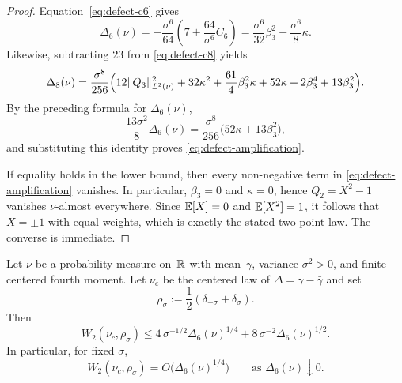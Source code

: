 \begin{proof}
Equation~\eqref{eq:defect-c6} gives
\[
\Delta_6(\nu)
=-\frac{\sigma^6}{64}\left(7+\frac{64}{\sigma^6}C_6\right)
=\frac{\sigma^6}{32}\beta_3^2+\frac{\sigma^6}{8}\kappa.
\]
Likewise, subtracting $23$ from \eqref{eq:defect-c8} yields
\[
\Delta_8(\nu)
=\frac{\sigma^8}{256}\Bigl(
12\|Q_3\|_{L^2(\nu)}^2
+32\kappa^2
+\frac{61}{4}\beta_3^2\kappa
+52\kappa
+2\beta_3^4
+13\beta_3^2
\Bigr).
\]
By the preceding formula for $\Delta_6(\nu)$,
\[
\frac{13\sigma^2}{8}\Delta_6(\nu)
=\frac{\sigma^8}{256}\bigl(52\kappa+13\beta_3^2\bigr),
\]
and substituting this identity proves \eqref{eq:defect-amplification}.

If equality holds in the lower bound, then every non-negative term in
\eqref{eq:defect-amplification} vanishes.  In particular,
$\beta_3=0$ and $\kappa=0$, hence $Q_2=X^2-1$ vanishes
$\nu$-almost everywhere.  Since $\mathbb{E}[X]=0$ and $\mathbb{E}[X^2]=1$, it follows
that $X=\pm 1$ with equal weights, which is exactly the stated
two-point law.  The converse is immediate.
\end{proof}

\begin{theorem}%
\label{thm:poisson-defect-stability}
Let $\nu$ be a probability measure on~$\mathbb{R}$ with mean~$\bar\gamma$,
variance $\sigma^2>0$, and finite centered fourth moment.  Let
$\nu_c$ be the centered law of $\Delta=\gamma-\bar\gamma$ and set
\[
\rho_\sigma:=\frac12(\delta_{-\sigma}+\delta_\sigma).
\]
Then
\[
W_2(\nu_c,\rho_\sigma)
\le
4\,\sigma^{-1/2}\Delta_6(\nu)^{1/4}
+8\,\sigma^{-2}\Delta_6(\nu)^{1/2}.
\]
In particular, for fixed $\sigma$,
\[
W_2(\nu_c,\rho_\sigma)=O\!\bigl(\Delta_6(\nu)^{1/4}\bigr)
\qquad\text{as }\Delta_6(\nu)\downarrow 0.
\]
\end{theorem}

